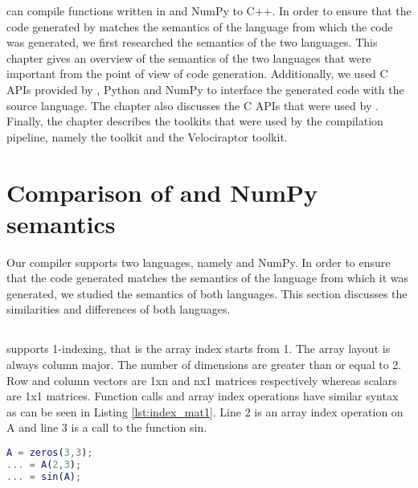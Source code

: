 \velocty can compile functions written in \matlab and NumPy to C++. In order to ensure that the code generated by \velocty matches the semantics of the language from which the code was generated, we first researched the semantics of the two languages. This chapter gives an overview of the semantics of the two languages that were important from the point of view of code generation.  Additionally, we used C APIs provided by \matlab, Python and NumPy to interface the generated code with the source language. The chapter also discusses the C APIs that were used by \velocty. Finally, the chapter describes the toolkits that were used by the compilation pipeline, namely the \mclab toolkit and the Velociraptor toolkit. 
\section{Comparison of \matlab and NumPy semantics}
Our compiler supports two languages, namely \matlab and NumPy. In order to ensure that the code generated matches the semantics of the language from which it was generated, we studied the semantics of both languages. This section discusses the similarities and differences of both languages. 
\subsection{\matlab}
\matlab supports 1-indexing, that is the array index starts from 1. 
The array layout is always column major. The number of dimensions are greater than or equal to 2. Row and column vectors are 1xn and nx1 matrices respectively whereas  scalars are 1x1 matrices. Function calls and array index operations have similar syntax as can be seen in Listing \ref{lst:index_mat1}. Line 2 is an array index operation on \textsf{A} and line 3 is a call to the function \textsf{sin}. 
\begin{lstlisting}[language=matlab, label={lst:index_mat1}, caption={An example of an array index operation and a function call.The array index operation and the function call have similar syntax. }]
A = zeros(3,3);
... = A(2,3);
...	= sin(A);
\end{lstlisting}

